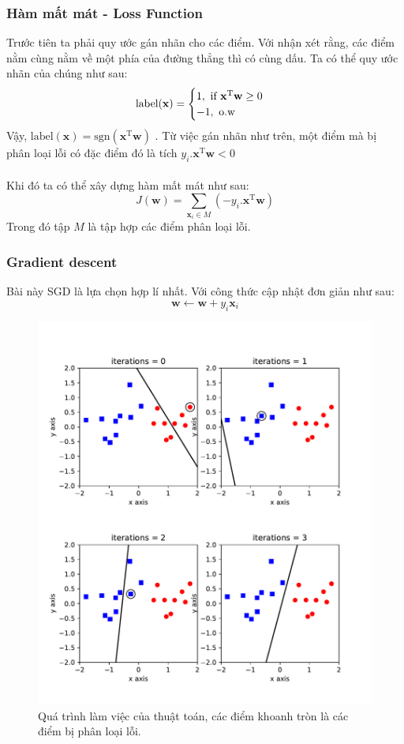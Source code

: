 \documentclass{article}
\begin{document}
\subsubsection*{Hàm mất mát - Loss Function }
Trước tiên ta phải quy ước gán nhãn cho các điểm. Với nhận xét rằng, các điểm nằm cùng nằm về một phía của đường thẳng thì có cùng dấu. Ta có thể quy ước nhãn của chúng như sau:
\begin{equation}
    \text{label(\textbf{x})} = \begin{cases}
1, \text{ if } \textbf{x}^{\text{T}}\textbf{w} \geq 0\\
-1, \text{ o.w}
    \end{cases}
    \label{eq14}
\end{equation}
Vậy, $\text{label}(\textbf{x}) = \text{sgn}(\textbf{x}^{\text{T}}\textbf{w})$
. Từ việc gán nhãn như trên, một điểm mà bị phân loại lỗi có đặc điểm đó là tích $y_i.\textbf{x}^{\text{T}}\textbf{w}<0$ 
\\\\
Khi đó ta có thể xây dựng hàm mất mát như sau:
\begin{equation}
    J(\textbf{w}) = \sum_{\textbf{x}_i \in M} (-y_i.\textbf{x}^{\text{T}}\textbf{w})
\end{equation}
Trong đó tập $M$ là tập hợp các điểm phân loại lỗi.
\subsubsection*{Gradient descent}
Bài này SGD là lựa chọn hợp lí nhất. Với công thức cập nhật đơn giản như sau:
\begin{equation}
    \textbf{w} \leftarrow \textbf{w}+y_i\textbf{x}_i
\end{equation}
 \begin{figure}[ht!]
     \centering
     \includegraphics[width = 0.8\linewidth]{perceptron2.pdf}
     \caption{Quá trình làm việc của thuật toán, các điểm khoanh tròn là các điểm bị phân loại lỗi.}
     \label{fig9}
 \end{figure}
\end{document}
